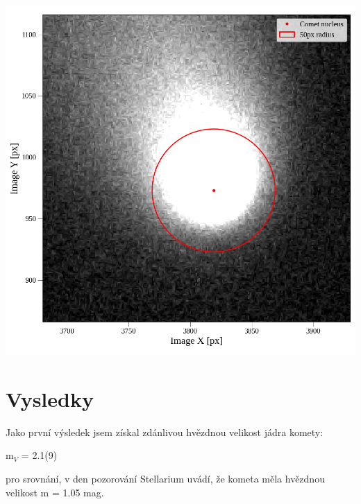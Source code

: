 \documentclass[a4paper,11pt]{article}
\begin{document}
    \begin{minipage}[t]{0.5\textwidth}
            \vspace{-15pt}   
            \par \centering
            \includegraphics[scale=0.35]{comet_clean}
            \captionsetup{justification=centering, font=footnotesize}
            \label{fig:comet_clean}
            \vspace{10pt}
            \raggedright 

        \section{Vysledky}
        Jako první výsledek jsem získal zdánlivou hvězdnou velikost jádra komety: 
        \begin{center}
            m$_V$ = 2.1(9)
        \end{center}
        \par pro srovnání, v den pozorování Stellarium uvádí, že kometa měla hvězdnou velikost m = 1.05 mag.
        
    \end{minipage}
\newpage
\end{document}
